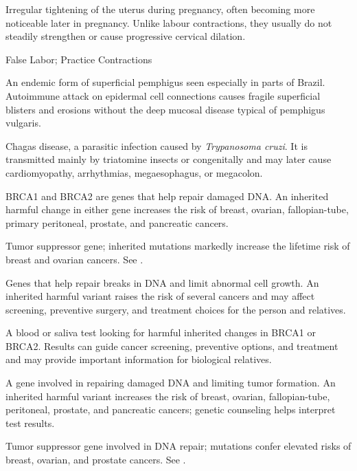  Irregular tightening of the uterus during pregnancy, often becoming more noticeable later in pregnancy. Unlike labour contractions, they usually do not steadily strengthen or cause progressive cervical dilation.

\synonyms
False Labor; Practice Contractions

 An endemic form of superficial pemphigus seen especially in parts of Brazil. Autoimmune attack on epidermal cell connections causes fragile superficial blisters and erosions without the deep mucosal disease typical of pemphigus vulgaris.

 Chagas disease, a parasitic infection caused by \textit{Trypanosoma cruzi}. It is transmitted mainly by triatomine insects or congenitally and may later cause cardiomyopathy, arrhythmias, megaesophagus, or megacolon.

 BRCA1 and BRCA2 are genes that help repair damaged DNA. An inherited harmful change in either gene increases the risk of breast, ovarian, fallopian-tube, primary peritoneal, prostate, and pancreatic cancers.

 Tumor suppressor gene; inherited mutations markedly increase the lifetime risk of breast and ovarian cancers. See .

 Genes that help repair breaks in DNA and limit abnormal cell growth. An inherited harmful variant raises the risk of several cancers and may affect screening, preventive surgery, and treatment choices for the person and relatives.

 A blood or saliva test looking for harmful inherited changes in BRCA1 or BRCA2. Results can guide cancer screening, preventive options, and treatment and may provide important information for biological relatives.

 A gene involved in repairing damaged DNA and limiting tumor formation. An inherited harmful variant increases the risk of breast, ovarian, fallopian-tube, peritoneal, prostate, and pancreatic cancers; genetic counseling helps interpret test results.

 Tumor suppressor gene involved in DNA repair; mutations confer elevated risks of breast, ovarian, and prostate cancers. See .

